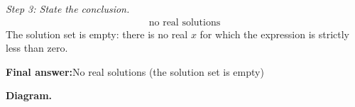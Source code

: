 \documentclass[11pt]{article}
\begin{document}
\textit{Step 3: State the conclusion.}
\[\begin{gathered}
\text{no real solutions}
\end{gathered}\]
The solution set is empty: there is no real \( x \) for which the expression is strictly less than zero.

\begin{answerbox}
\textbf{Final answer:}\quad No real solutions (the solution set is empty)
\end{answerbox}
\textbf{Diagram.}

\begin{center}
\end{center}
\end{document}
